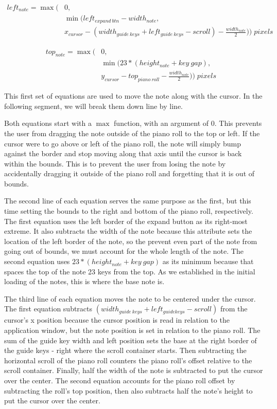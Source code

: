 \begin{align} \label{move_horz}
  left_{note} = \max( & 0, \\
  & \min(left_{expand\:btn} - width_{note}, \\
  & x_{cursor} - (width_{guide\:keys} + left_{guide\:keys} - scroll) - \frac{width_{note}}{2})) \;pixels &
\end{align}

\begin{align} \label{move_vert}
  top_{note} = \max( & 0, \\
  & \min(23 * (height_{note} + key\:gap), \\
  & y_{cursor} - top_{piano\:roll} - \frac{width_{note}}{2})) \;pixels &
\end{align}

This first set of equations are used to move the note along with the cursor. In the following
segment, we will break them down line by line.

Both equations start with a $ \max $ function, with an argument of $ 0 $. This prevents the user from
dragging the note outside of the piano roll to the top or left. If the cursor were to go above or
left of the piano roll, the note will simply bump against the border and stop moving along that
axis until the cursor is back within the bounds. This is to prevent the user from losing the note
by accidentally dragging it outside of the piano roll and forgetting that it is out of bounds.

The second line of each equation serves the same purpose as the first, but this time setting the
bounds to the right and bottom of the piano roll, respectively. The first equation uses the left
border of the expand button as its right-most extreme. It also subtracts the width of the note
because this attribute sets the location of the left border of the note, so the prevent even part
of the note from going out of bounds, we must account for the whole length of the note. The second
equation uses $ 23*(height_{note} + key\: gap) $ as its minimum because that spaces the top of the
note 23 keys from the top. As we established in the initial loading of the notes, this is where the
base note is.

The third line of each equation moves the note to be centered under the cursor. The first equation
subtracts $ (width_{guide\:keys} +left_{guide keys} - scroll) $ from the cursor’s x position because
the cursor position is read in relation to the application window, but the note position is set in
relation to the piano roll. The sum of the guide key width and left position sets the base at the
right border of the guide keys - right where the scroll container starts. Then subtracting the
horizontal scroll of the piano roll counters the piano roll’s offset relative to the scroll
container. Finally, half the width of the note is subtracted to put the cursor over the center. The
second equation accounts for the piano roll offset by subtracting the roll’s top position, then
also subtracts half the note’s height to put the cursor over the center.

